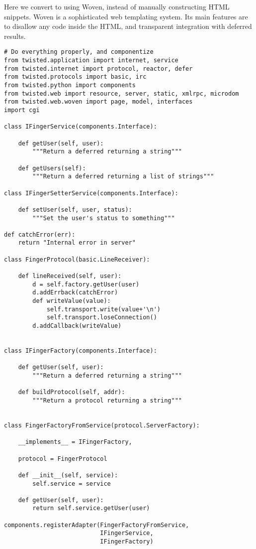 Here we convert to using Woven, instead of manually constructing HTML snippets. Woven is a sophisticated web templating system. Its main features are to disallow any code inside the HTML, and transparent integration with deferred results.\begin{verbatim}
# Do everything properly, and componentize
from twisted.application import internet, service
from twisted.internet import protocol, reactor, defer
from twisted.protocols import basic, irc
from twisted.python import components
from twisted.web import resource, server, static, xmlrpc, microdom
from twisted.web.woven import page, model, interfaces
import cgi

class IFingerService(components.Interface):

    def getUser(self, user):
        """Return a deferred returning a string"""

    def getUsers(self):
        """Return a deferred returning a list of strings"""

class IFingerSetterService(components.Interface):

    def setUser(self, user, status):
        """Set the user's status to something"""

def catchError(err):
    return "Internal error in server"

class FingerProtocol(basic.LineReceiver):

    def lineReceived(self, user):
        d = self.factory.getUser(user)
        d.addErrback(catchError)
        def writeValue(value):
            self.transport.write(value+'\n')
            self.transport.loseConnection()
        d.addCallback(writeValue)


class IFingerFactory(components.Interface):

    def getUser(self, user):
        """Return a deferred returning a string"""

    def buildProtocol(self, addr):
        """Return a protocol returning a string"""


class FingerFactoryFromService(protocol.ServerFactory):

    __implements__ = IFingerFactory,

    protocol = FingerProtocol

    def __init__(self, service):
        self.service = service

    def getUser(self, user):
        return self.service.getUser(user)

components.registerAdapter(FingerFactoryFromService,
                           IFingerService,
                           IFingerFactory)


\end{verbatim}

